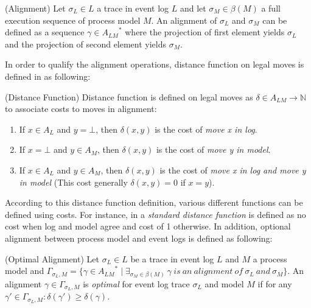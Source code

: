 \theoremstyle{definition}
\begin{definition}{}
(Alignment) Let $\sigma_{L} \in L$ a trace in event log $L$ and let $\sigma_{M} \in \beta (M)$ a full execution sequence of process model $M$. An alignment of $\sigma_{L}$ and $\sigma_{M}$ can be defined as a sequence $\gamma \in {A_{LM}}^{*}$  where the projection of first element yields $\sigma_{L}$ and the projection of second element yields $\sigma_{M}$. 
\end{definition}

In order to qualify the alignment operations, distance function on legal moves is defined in \cite{van2012replaying} as following:
\theoremstyle{definition}
\begin{definition}{}
(Distance Function) Distance function is defined on legal moves as $\delta \in A_{LM} \rightarrow \mathbb{N}$ to associate costs to moves in alignment:
\begin{enumerate}
  \item If $x \in A_{L}$ and $y=\bot$, then  $\delta(x,y)$ is the cost of \textit{move x in log}.
  \item If $x=\bot$ and $y \in A_{M}$, then  $\delta(x,y)$ is the cost of \textit{move y in model}.
  \item If $x \in A_{L}$ and $y \in A_{M}$, then  $\delta(x,y)$ is the cost of \textit{move x in log and move y in model} (This cost generally $\delta(x,y) = 0$ if $x = y$).
\end{enumerate}
\end{definition}

According to this distance function definition, various different functions can be defined using costs. For instance, in \cite{van2012replaying} a \textit{standard distance function} is defined as no cost when log and model agree and cost of 1 otherwise. In addition, optional alignment between process model and event logs is defined as following:
 
\begin{definition}{}
(Optimal Alignment) Let $\sigma_{L} \in L$ be a trace in event log $L$ and $M$ a process model and $\Gamma_{\sigma_{L},M} = \{ \gamma \in {A_{LM}}^{*} \mid \exists_{\sigma_{M} \in \beta (M)}\ \gamma\ is\ an\ alignment\ of\ \sigma_{L}\ and\ \sigma_{M} \}$. An alignment $\gamma \in \Gamma_{\sigma_{L},M}$ is \textit{optimal} for event log trace $\sigma_{L}$ and model $M$ if for any ${\gamma}' \in \Gamma_{\sigma_{L},M} : \delta({\gamma}')\geq \delta(\gamma)$.
\end{definition}

